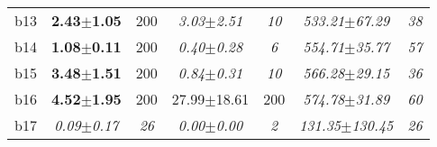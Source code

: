 \begin{longtable}{|l|c|c|c|c|c|c|}
\\
b13&\textbf{2.43$\pm$1.05} & 200 &\textit{3.03$\pm$2.51} & \textit{10 }&\textit{533.21$\pm$67.29} & \textit{38 }
\\
b14&\textbf{1.08$\pm$0.11} & 200 &\textit{0.40$\pm$0.28} & \textit{6 }&\textit{554.71$\pm$35.77} & \textit{57 }
\\
b15&\textbf{3.48$\pm$1.51} & 200 &\textit{0.84$\pm$0.31} & \textit{10 }&\textit{566.28$\pm$29.15} & \textit{36 }
\\
b16&\textbf{4.52$\pm$1.95} & 200 &27.99$\pm$18.61 & 200 &\textit{574.78$\pm$31.89} & \textit{60 }
\\
b17&\textit{0.09$\pm$0.17} & \textit{26 }&\textit{0.00$\pm$0.00} & \textit{2 }&\textit{131.35$\pm$130.45} & \textit{26 }
\\
\hline
\end{longtable}
